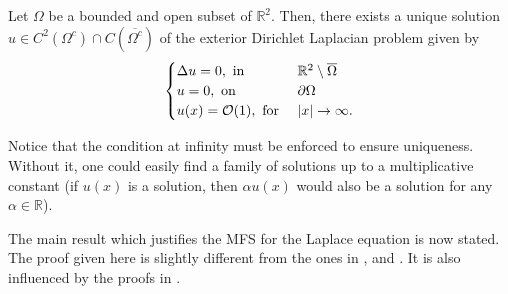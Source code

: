 \begin{theorem}
    Let \(\Omega\) be a bounded and open subset of \(\mathbb{R}^2\). Then, there exists a unique solution \(u \in C^2(\Omega^c) \cap C(\overline{\Omega^c})\) of the exterior Dirichlet Laplacian problem given by
    \[
        \begin{cases}
            \Delta u = 0, \text{ in } & \mathbb{R}^2\setminus \overline{\Omega}\\
            u = 0, \text{ on } & \partial \Omega\\
            u(x) = \mathcal{O}(1), \text{ for } & \abs{x} \rightarrow \infty.
        \end{cases}
    \]
\end{theorem}

\begin{remark}
    Notice that the condition at infinity must be enforced to ensure uniqueness. Without it, one could easily find a family of solutions up to a multiplicative constant (if \(u(x)\) is a solution, then \(\alpha u(x)\) would also be a solution for any \(\alpha \in \mathbb{R}\)).
\end{remark}

The main result which justifies the \ac{MFS} for the Laplace equation is now stated. The proof given here is slightly different from the ones in \cite{bogomolny1985fundamental}, \cite{alves2009choice} and \cite{smyrlis2009applicability}. It is also influenced by the proofs in \cite{svilen_phd}.

